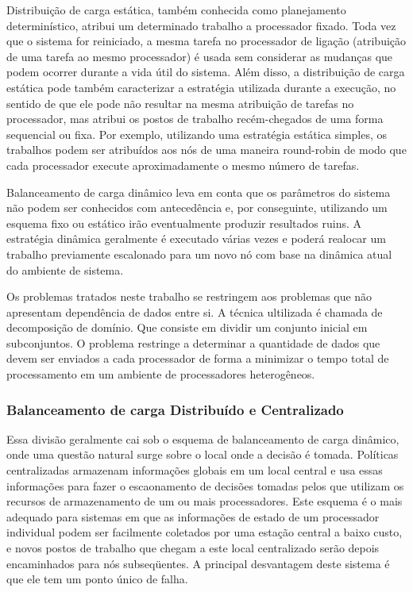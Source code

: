 Distribuição de carga estática, também conhecida como planejamento determinístico, atribui um determinado trabalho a processador fixado. Toda vez que o sistema for reiniciado, a mesma tarefa no processador de ligação (atribuição de uma tarefa ao mesmo processador) é usada sem considerar as mudanças que podem ocorrer durante a vida útil do sistema. Além disso, a distribuição de carga estática pode também caracterizar a estratégia utilizada durante a execução, no sentido de que ele pode não resultar na mesma atribuição de tarefas no processador, mas atribui os postos de trabalho recém-chegados de uma forma sequencial ou fixa. Por exemplo, utilizando uma estratégia estática simples, os trabalhos podem ser atribuídos aos nós de uma maneira round-robin de modo que cada processador execute aproximadamente o mesmo número de tarefas. 

Balanceamento de carga dinâmico leva em conta que os parâmetros do sistema não podem ser conhecidos com antecedência e, por conseguinte, utilizando um esquema fixo ou estático irão eventualmente produzir resultados ruins. A estratégia dinâmica geralmente é executado várias vezes e poderá realocar um trabalho previamente escalonado para um novo nó com base na dinâmica atual do ambiente de sistema.

Os problemas tratados neste trabalho se restringem aos problemas que não apresentam dependência de dados entre si. A técnica ultilizada é chamada de decomposição de domínio. Que consiste em dividir um conjunto inicial em subconjuntos. O problema restringe a determinar a quantidade de dados que devem ser enviados a cada processador de forma a minimizar o tempo total de processamento em um ambiente de processadores heterogêneos. 

\subsubsection{Balanceamento de carga Distribuído e Centralizado}

Essa divisão geralmente cai sob o esquema de balanceamento de carga dinâmico, onde uma questão natural surge sobre o local onde a decisão é tomada. Políticas centralizadas armazenam informações globais em um local central e usa essas informações para fazer o escaonamento de decisões tomadas pelos que utilizam os recursos de armazenamento de um ou mais processadores. Este esquema é o mais adequado para sistemas em que as informações de estado de um processador individual podem ser facilmente coletados por uma estação central a baixo custo, e novos postos de trabalho que chegam a este local centralizado serão depois encaminhados para nós subseqüentes. A principal desvantagem deste sistema é que ele tem um ponto único de falha. 

